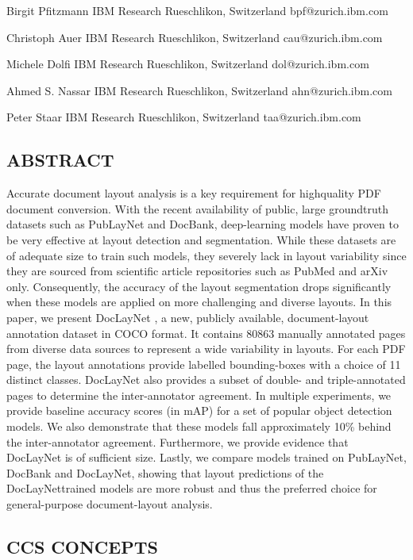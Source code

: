 Birgit Pfitzmann IBM Research Rueschlikon, Switzerland bpf@zurich.ibm.com

Christoph Auer IBM Research Rueschlikon, Switzerland cau@zurich.ibm.com

Michele Dolfi IBM Research Rueschlikon, Switzerland dol@zurich.ibm.com

Ahmed S. Nassar IBM Research Rueschlikon, Switzerland ahn@zurich.ibm.com

Peter Staar IBM Research Rueschlikon, Switzerland taa@zurich.ibm.com

\subsection{ABSTRACT}

Accurate document layout analysis is a key requirement for highquality PDF document conversion. With the recent availability of public, large groundtruth datasets such as PubLayNet and DocBank, deep-learning models have proven to be very effective at layout detection and segmentation. While these datasets are of adequate size to train such models, they severely lack in layout variability since they are sourced from scientific article repositories such as PubMed and arXiv only. Consequently, the accuracy of the layout segmentation drops significantly when these models are applied on more challenging and diverse layouts. In this paper, we present DocLayNet , a new, publicly available, document-layout annotation dataset in COCO format. It contains 80863 manually annotated pages from diverse data sources to represent a wide variability in layouts. For each PDF page, the layout annotations provide labelled bounding-boxes with a choice of 11 distinct classes. DocLayNet also provides a subset of double- and triple-annotated pages to determine the inter-annotator agreement. In multiple experiments, we provide baseline accuracy scores (in mAP) for a set of popular object detection models. We also demonstrate that these models fall approximately 10\% behind the inter-annotator agreement. Furthermore, we provide evidence that DocLayNet is of sufficient size. Lastly, we compare models trained on PubLayNet, DocBank and DocLayNet, showing that layout predictions of the DocLayNettrained models are more robust and thus the preferred choice for general-purpose document-layout analysis.

\subsection{CCS CONCEPTS}

